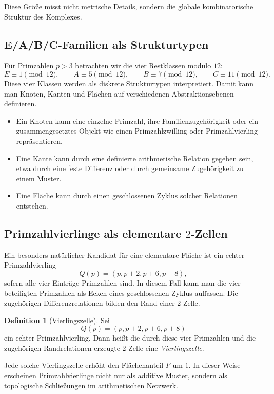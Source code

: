 \documentclass[11pt,a4paper]{article}
\theoremstyle{definition}
\newtheorem{definition}{Definition}[section]
\theoremstyle{plain}
\theoremstyle{remark}
\begin{document}
	Diese Größe misst nicht metrische Details, sondern die globale kombinatorische Struktur des Komplexes.
	
	\subsection{E/A/B/C-Familien als Strukturtypen}
	
	Für Primzahlen \(p>3\) betrachten wir die vier Restklassen modulo \(12\):
	\[
	E \equiv 1 \pmod{12},\qquad
	A \equiv 5 \pmod{12},\qquad
	B \equiv 7 \pmod{12},\qquad
	C \equiv 11 \pmod{12}.
	\]
	Diese vier Klassen werden als diskrete Strukturtypen interpretiert. Damit kann man Knoten, Kanten und Flächen auf verschiedenen Abstraktionsebenen definieren.
	
	\begin{itemize}
		\item Ein Knoten kann eine einzelne Primzahl, ihre Familienzugehörigkeit oder ein zusammengesetztes Objekt wie einen Primzahlzwilling oder Primzahlvierling repräsentieren.
		\item Eine Kante kann durch eine definierte arithmetische Relation gegeben sein, etwa durch eine feste Differenz oder durch gemeinsame Zugehörigkeit zu einem Muster.
		\item Eine Fläche kann durch einen geschlossenen Zyklus solcher Relationen entstehen.
	\end{itemize}
	
	\subsection{Primzahlvierlinge als elementare \(2\)-Zellen}
	
	Ein besonders natürlicher Kandidat für eine elementare Fläche ist ein echter Primzahlvierling
	\[
	Q(p)=(p,p+2,p+6,p+8),
	\]
	sofern alle vier Einträge Primzahlen sind. In diesem Fall kann man die vier beteiligten Primzahlen als Ecken eines geschlossenen Zyklus auffassen. Die zugehörigen Differenzrelationen bilden den Rand einer \(2\)-Zelle.
	
	\begin{definition}[Vierlingszelle]
		Sei
		\[
		Q(p)=(p,p+2,p+6,p+8)
		\]
		ein echter Primzahlvierling. Dann heißt die durch diese vier Primzahlen und die zugehörigen Randrelationen erzeugte \(2\)-Zelle eine \emph{Vierlingszelle}.
	\end{definition}
	
	Jede solche Vierlingszelle erhöht den Flächenanteil \(F\) um \(1\). In dieser Weise erscheinen Primzahlvierlinge nicht nur als additive Muster, sondern als topologische Schließungen im arithmetischen Netzwerk.
	
\end{document}
